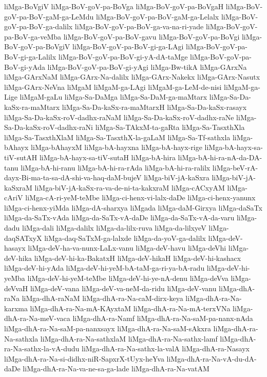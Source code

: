 {liMga-BoVgiV
liMga-BoV-goV-pa-BoVga
liMga-BoV-goV-pa-BoVgaH
liMga-BoV-goV-pa-BoV-gaM-ga-LeMdu
liMga-BoV-goV-pa-BoV-gaM-ga-Lelalx
liMga-BoV-goV-pa-BoV-ga-dalilx
liMga-BoV-goV-pa-BoV-ga-va-na-ri-yade
liMga-BoV-goV-pa-BoV-ga-veMba
liMga-BoV-goV-pa-BoV-gavu
liMga-BoV-goV-pa-BoVgi
liMga-BoV-goV-pa-BoVgiV
liMga-BoV-goV-pa-BoV-gi-ga-LAgi
liMga-BoV-goV-pa-BoV-gi-ga-Lalilx
liMga-BoV-goV-pa-BoV-gi-yA-dA-taMge
liMga-BoV-goV-pa-BoV-gi-yAda
liMga-BoV-goV-pa-BoV-gi-yAgi
liMga-Bw-tikA
liMga-GArxNa
liMga-GArxNaM
liMga-GArx-Na-dalilx
liMga-GArx-Nakekx
liMga-GArx-Nasutx
liMga-GArx-NeVna
liMgaM
liMgaM-ga-LAgi
liMgaM-ga-LeM-de-nisi
liMgaM-ga-Lige
liMgaM-gaLu
liMga-Sa-DaMga
liMga-Sa-DaM-ga-maMtarx
liMga-Sa-Da-kaSx-ra-maMtarx
liMga-Sa-Da-kaSx-ra-maMtarxH
liMga-Sa-Da-kaSx-rasayx
liMga-Sa-Da-kaSx-roV-dadhx-raNaM
liMga-Sa-Da-kaSx-roV-dadhx-raNe
liMga-Sa-Da-kaSx-roV-dadhx-raNi
liMga-Sa-TAkxM-ta-gaRta
liMga-Sa-TasxthXla
liMga-Sa-TasxthXlaM
liMga-Sa-TasxthX-la-gaLaM
liMga-Sa-Tf-sathxla
liMga-bAhayx
liMga-bAhayxM
liMga-bA-hayxna
liMga-bA-hayx-rige
liMga-bA-hayx-sa-tiV-sutAH
liMga-bA-hayx-sa-tiV-sutaH
liMga-bA-hira
liMga-bA-hi-ra-nA-da-DA-tanu
liMga-bA-hi-ranu
liMga-bA-hi-ra-rAda
liMga-bA-hi-ra-ralilx
liMga-beV-rA-dayx-Bi-ma-ta-sa-dA-shi-va-haq-daM-bujeV
liMga-biV-jA-kaSxra
liMga-biV-jA-kaSxraM
liMga-biV-jA-kaSx-ra-va-de-ni-ta-kakxraM
liMga-cACxyAM
liMga-cAriV
liMga-cA-ri-yeM-teMbe
liMga-ci-henx-vi-lalx-daDe
liMga-ci-henx-yanunx
liMga-ci-henx-yiMda
liMga-dA-sharxya
liMgada
liMga-daM-Girxya
liMga-daSaTx
liMga-da-SaTx-vAda
liMga-da-SaTx-vA-daDe
liMga-da-SaTx-vA-da-varu
liMga-dadu
liMga-dali
liMga-dalilx
liMga-da-lilx-ruva
liMga-da-lilxyeV
liMga-daqSATxyX
liMga-daq-SaTxM-ga-lalxde
liMga-da-yoV-ga-dalilx
liMga-deV-hasayx
liMga-deV-ha-va-nunx-LaLx-vanu
liMga-deV-havu
liMga-deVhi
liMga-deV-hika
liMga-deV-hi-ka-BakatxH
liMga-deV-hikaH
liMga-deV-hi-kashacx
liMga-deV-hi-yAda
liMga-deV-hi-yeM-bA-taM-ga-ri-ya-bA-radu
liMga-deV-hi-yeMba
liMga-deV-hi-yeM-teMbe
liMga-deV-hi-ye-nA-denu
liMga-deVva
liMga-deVvaH
liMga-deV-vana
liMga-deV-va-neM-da-ridu
liMga-deV-vanu
liMga-dhA-raNa
liMga-dhA-raNaM
liMga-dhA-ra-Na-caM-dirx-keya
liMga-dhA-ra-Na-karxma
liMga-dhA-ra-Na-mA-KAyxtaM
liMga-dhA-ra-Na-mA-terxVNa
liMga-dhA-ra-Na-meV-vaca
liMga-dhA-ra-Namf
liMga-dhA-ra-Na-saM-pa-nanx-nAda
liMga-dhA-ra-Na-saM-pa-nanxsayx
liMga-dhA-ra-Na-saM-sAkxra
liMga-dhA-ra-Na-sathxla
liMga-dhA-ra-Na-sathxlaM
liMga-dhA-ra-Na-sathx-lamf
liMga-dhA-ra-Na-sathx-la-vA-dudu
liMga-dhA-ra-Na-sathx-la-valA
liMga-dhA-ra-Nasayx
liMga-dhA-ra-Na-si-didhx-niR-SapxrX-tUyx-heYva
liMga-dhA-ra-Na-vA-du-dA-daDe
liMga-dhA-ra-Na-va-ne-sa-ga-lade
liMga-dhA-ra-Na-vatAM
}
